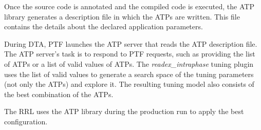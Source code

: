 Once the source code is annotated and the compiled code is executed, the ATP library generates a description file in which the ATPs are written. This file contains the details about the declared application parameters.

During DTA, PTF launches the ATP server that reads the ATP description file. The ATP server's task is to respond to PTF requests, such as providing the list of ATPs or a list of valid values of ATPs. The \textit{readex\_intraphase} tuning plugin uses the list of valid values to generate a search space of the tuning parameters (not only the ATPs) and explore it. The resulting tuning model also consists of the best combination of the ATPs.

The RRL uses the ATP library during the production run to apply the best configuration. 




